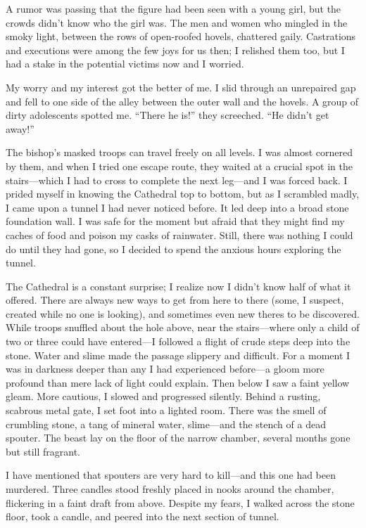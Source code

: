 A rumor was passing that the figure had been seen with a young girl, but the crowds didn’t know who the girl was. The men and women who mingled in the smoky light, between the rows of open-roofed hovels, chattered gaily. Castrations and executions were among the few joys for us then; I relished them too, but I had a stake in the potential victims now and I worried.

My worry and my interest got the better of me. I slid through an unrepaired gap and fell to one side of the alley between the outer wall and the hovels. A group of dirty adolescents spotted me. “There he is!” they screeched. “He didn’t get away!”

The bishop’s masked troops can travel freely on all levels. I was almost cornered by them, and when I tried one escape route, they waited at a crucial spot in the stairs—which I had to cross to complete the next leg—and I was forced back. I prided myself in knowing the Cathedral top to bottom, but as I scrambled madly, I came upon a tunnel I had never noticed before. It led deep into a broad stone foundation wall. I was safe for the moment but afraid that they might find my caches of food and poison my casks of rainwater. Still, there was nothing I could do until they had gone, so I decided to spend the anxious hours exploring the tunnel.

The Cathedral is a constant surprise; I realize now I didn’t know half of what it offered. There are always new ways to get from here to there (some, I suspect, created while no one is looking), and sometimes even new theres to be discovered. While troops snuffled about the hole above, near the stairs—where only a child of two or three could have entered—I followed a flight of crude steps deep into the stone. Water and slime made the passage slippery and difficult. For a moment I was in darkness deeper than any I had experienced before—a gloom more profound than mere lack of light could explain. Then below I saw a faint yellow gleam. More cautious, I slowed and progressed silently. Behind a rusting, scabrous metal gate, I set foot into a lighted room. There was the smell of crumbling stone, a tang of mineral water, slime—and the stench of a dead spouter. The beast lay on the floor of the narrow chamber, several months gone but still fragrant.

I have mentioned that spouters are very hard to kill—and this one had been murdered. Three candles stood freshly placed in nooks around the chamber, flickering in a faint draft from above. Despite my fears, I walked across the stone floor, took a candle, and peered into the next section of tunnel.


